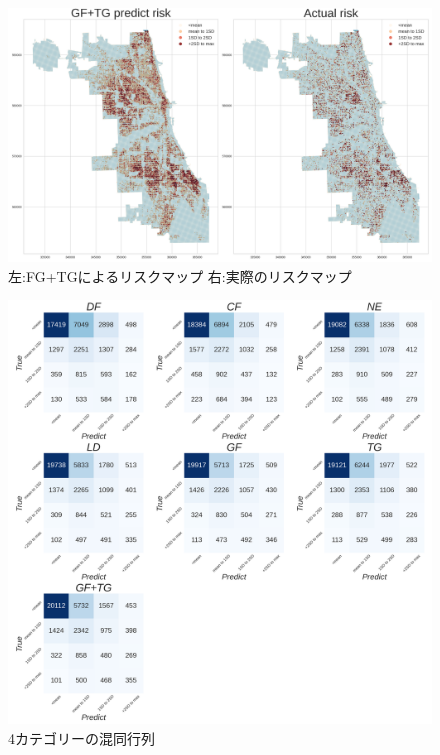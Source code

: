 \begin{figure}
  \centering %
  \includegraphics[scale=0.25]{./add-crime-timeseries-fig/GF+TG_riskmap.png}
  \caption{左:FG+TGによるリスクマップ 右:実際のリスクマップ}
  \label{fig:add-crime-timeseries-gf-tg-risk}
\end{figure}
\begin{figure}
  \centering %
  \includegraphics[scale=0.16]{./add-crime-timeseries-fig/non_crime_no_timeseries_four_cm.png}
  \caption{4カテゴリーの混同行列}
  \label{fig:add-crime-timeseries-4cm}
\end{figure}

